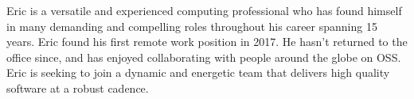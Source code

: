 

\begin{cvparagraph}
Eric is a versatile and experienced computing professional who has found himself
	in many demanding and compelling roles throughout his career spanning 15 years.
	Eric found his first remote work position in 2017. He hasn't returned to the office
	since, and has enjoyed collaborating with people around the globe on OSS.
	Eric is seeking to join a dynamic and energetic team that delivers high quality software
	at a robust cadence.
\end{cvparagraph}
